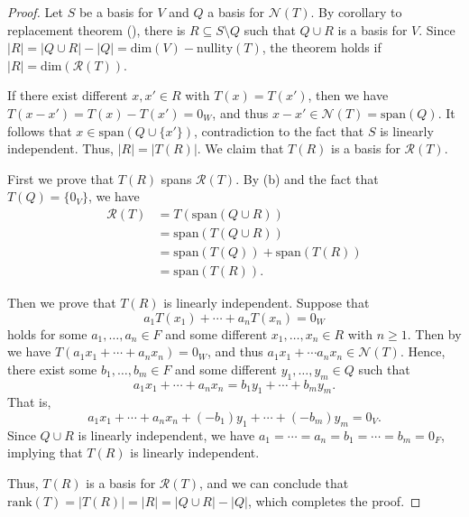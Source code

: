 \begin{proof}
  Let $S$ be a basis for $V$ and $Q$ a basis for $\mathcal{N}(T)$.
  By corollary to replacement theorem (), there is
  $R \subseteq S \setminus Q$ such that $Q \cup R$ is a basis for $V$.
  Since $|R| = |Q \cup R| - |Q| = \mathrm{dim}(V) - \mathrm{nullity}(T)$,
  the theorem holds if $|R| = \mathrm{dim}(\mathcal{R}(T))$.
  
  If there exist different $x, x' \in R$ with $T(x) = T(x')$, then we have
  $T(x - x') = T(x) - T(x') = 0_W$, and thus
  $x - x' \in \mathcal{N}(T) = \mathrm{span}(Q)$.
  It follows that $x \in \mathrm{span}(Q \cup \{x'\})$,
  contradiction to the fact that $S$ is linearly independent.
  Thus, $|R| = |T(R)|$. We claim that $T(R)$ is a basis for $\mathcal{R}(T)$.

  First we prove that $T(R)$ spans $\mathcal{R}(T)$.
  By  (b) and the fact that $T(Q) = \{0_V\}$, we have
  \begin{align*}
    \mathcal{R}(T) &= T(\mathrm{span}(Q \cup R)) \\
                   &= \mathrm{span}(T(Q \cup R)) \\
                   &= \mathrm{span}(T(Q)) + \mathrm{span}(T(R)) \\
                   &= \mathrm{span}(T(R)).
  \end{align*}

  Then we prove that $T(R)$ is linearly independent.
  Suppose that
  \begin{equation*}
    a_1T(x_1) + \cdots + a_nT(x_n) = 0_W
  \end{equation*}
  holds for some $a_1, \dots, a_n \in F$ and some different
  $x_1, \dots, x_n \in R$ with $n \geq 1$.
  Then by  we have $T(a_1x_1 + \cdots + a_nx_n) = 0_W$,
  and thus $a_1x_1 + \cdots a_nx_n \in \mathcal{N}(T)$.
  Hence, there exist some $b_1, \dots, b_m \in F$ and some different
  $y_1, \dots, y_m \in Q$ such that
  \begin{equation*}
    a_1x_1 + \cdots + a_nx_n = b_1y_1 + \cdots + b_my_m.
  \end{equation*}
  That is,
  \begin{equation*}
    a_1x_1 + \cdots + a_nx_n + (-b_1)y_1 + \cdots + (-b_m)y_m = 0_V.
  \end{equation*}
  Since $Q \cup R$ is linearly independent, we have
  $a_1 = \cdots = a_n = b_1 = \cdots = b_m = 0_F$, implying that $T(R)$ is
  linearly independent.

  Thus, $T(R)$ is a basis for $\mathcal{R}(T)$, and we can conclude that
  $\mathrm{rank}(T) = |T(R)| = |R| = |Q \cup R| - |Q|$,
  which completes the proof.
\end{proof}

